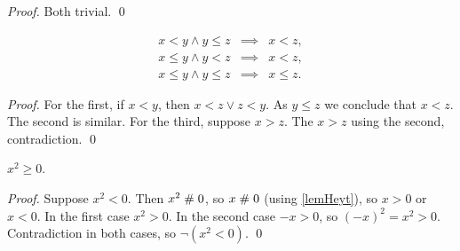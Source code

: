 \begin{proof}
Both trivial.
\qed
\end{proof}

\begin{lemma}\label{lemgeqtrans}
\begin{eqnarray*}
x< y \wedge y\leq z &\implies& x<z,\\
x\leq y \wedge y<z &\implies& x<z,\\
x\leq y \wedge y\leq z &\implies& x\leq z.
\end{eqnarray*}
\end{lemma}

\begin{proof}
For the first, if $x<y$, then $x<z\vee z<y$. As $y\leq z$ we conclude
that $x<z$. The second is similar. For the third, suppose $x>z$. The
$x>z$ using the second, contradiction.
\qed
\end{proof}


\begin{lemma}\label{lemsqpos}
$x^2 \geq 0$.
\end{lemma}

\begin{proof}
Suppose $x^2 < 0$. Then $x^2 \mathrel{\#} 0$, so $x\mathrel{\#} 0$ (using \ref{lemHeyt}), 
so $x>0$ or $x<0$. In the first case $x^2 >0$. In the second case $-x >0$, so
$(-x)^2 = x^2 >0$. Contradiction in both cases, so $\neg(x^2 < 0)$.
\qed
\end{proof}


  
